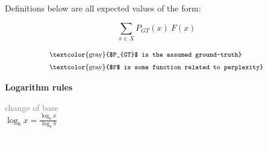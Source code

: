 \documentclass[a4paper,fleqn,reqno,12pt,landscape]{article}
\newcommand{\mygray}[1]{\textcolor{gray}{#1}}
\newcommand{\myremark}[1]{{\footnotesize\mygray{#1}}}
\begin{document}
\begin{paracol}{2}
\begin{minipage}[t]{0.5\linewidth}
    Definitions below are all expected values of the form: \\
    \begin{minipage}[t]{0.3\linewidth}
      \strut\vspace*{-\baselineskip}\newline
      \begin{equation*}
        \sum_{x \in X} P_{GT}(x) \ F(x)
      \end{equation*}
    \end{minipage}
    \hspace*{-0.5cm}
    \begin{minipage}[t]{0.5\linewidth}
      \strut\vspace*{-\baselineskip}\newline
      \vspace*{-0.75cm}
      \begin{align*}
        & \text{\myremark{$P_{GT}$ is the assumed ground-truth}}\\
        & \text{\myremark{$F$ is some function related to perplexity}}
      \end{align*}
    \end{minipage}
  \end{minipage}
  \hfill
  \begin{minipage}[t]{0.23\linewidth}
    \strut\vspace*{-\baselineskip}\newline
    \textbf{Logarithm rules}

    \medskip

    \myremark{change of base}\\
    \medskip
    $\log_{b} x = \frac{\log_{b} x}{\log_{b} b}$
  \end{minipage}
  \hfill
  \begin{minipage}[t]{0.2\linewidth}
    \strut\vspace*{-\baselineskip}\newline
    {\textcolor{white}{\textbf{Logarithm rules}}}

    \medskip


\end{minipage}
\end{paracol}
\end{document}
